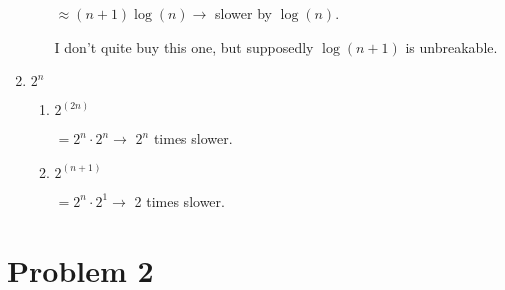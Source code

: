 \documentclass[10pt,reqno,sumlimits]{amsart}
\theoremstyle{plain}
\newtheorem{theorem}{Theorem}
\theoremstyle{definition}
\newcommand{\R}{{\mathbb R}}
\newcommand{\1}{{\bf 1}}
\numberwithin{equation}{section}
\begin{document}
\begin{enumerate}
\begin{enumerate}
\hspace{0.3in}$\approx (n+1)\log(n) \rightarrow $ slower by $\log(n)$.

I don't quite buy this one, but supposedly $\log(n+1)$ is unbreakable.
\end{enumerate}

\item $2^n$
\begin{enumerate}
\item $2^(2n)$

\hspace{0.3in}$= 2^n \cdot 2^n \rightarrow $ $2^n$ times slower.
\item $2^(n+1)$

\hspace{0.3in}$= 2^n \cdot 2^1 \rightarrow $ 2 times slower.
\end{enumerate}
\end{enumerate}

\section{Problem 2}



\end{document}

